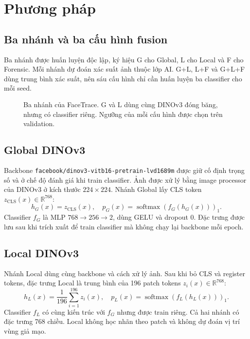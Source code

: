 \section{Phương pháp}
\subsection{Ba nhánh và ba cấu hình fusion}
Ba nhánh được huấn luyện độc lập, ký hiệu G cho Global, L cho Local và F cho Forensic. Mỗi nhánh dự đoán xác suất ảnh thuộc lớp AI. G+L, L+F và G+L+F dùng trung bình xác suất, nên sáu cấu hình chỉ cần huấn luyện ba classifier cho mỗi seed.

\begin{figure}[H]
\centering

\caption{Ba nhánh của FaceTrace. G và L dùng cùng DINOv3 đóng băng, nhưng có classifier riêng. Ngưỡng của mỗi cấu hình được chọn trên validation.}
\label{fig:method}
\end{figure}

\subsection{Global DINOv3}
Backbone \texttt{facebook/dinov3-vitb16-pretrain-lvd1689m} \cite{DINOv3_2025} được giữ cố định trọng số và ở chế độ đánh giá khi train classifier. Ảnh được xử lý bằng image processor của DINOv3 ở kích thước $224\times224$. Nhánh Global lấy CLS token $z_{\mathrm{CLS}}(x)\in\mathbb R^{768}$:
\begin{equation}
h_G(x)=z_{\mathrm{CLS}}(x),\quad
p_G(x)=\operatorname{softmax}(f_G(h_G(x)))_1.
\end{equation}
Classifier $f_G$ là MLP $768\rightarrow256\rightarrow2$, dùng GELU và dropout 0. Đặc trưng được lưu sau khi trích xuất để train classifier mà không chạy lại backbone mỗi epoch.

\subsection{Local DINOv3}
Nhánh Local dùng cùng backbone và cách xử lý ảnh. Sau khi bỏ CLS và register tokens, đặc trưng Local là trung bình của 196 patch tokens $z_i(x)\in\mathbb R^{768}$:
\begin{equation}
h_L(x)=\frac1{196}\sum_{i=1}^{196}z_i(x),\quad
p_L(x)=\operatorname{softmax}(f_L(h_L(x)))_1.
\end{equation}
Classifier $f_L$ có cùng kiến trúc với $f_G$ nhưng được train riêng. Cả hai nhánh có đặc trưng 768 chiều. Local không học nhãn theo patch và không dự đoán vị trí vùng giả mạo.

